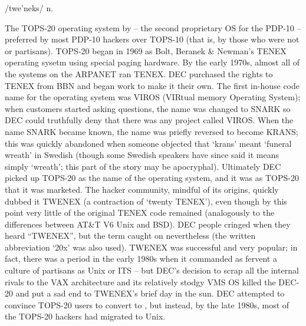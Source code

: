  /twe'neks/ n.

The TOPS-20 operating system by  -- the second proprietary OS for the PDP-10 -- preferred by most PDP-10 hackers over
TOPS-10 (that is, by those who were not  or  partisans). TOPS-20 began in 1969 as Bolt, Beranek \&
Newman's TENEX operating sysetm using special paging hardware. By the early 1970s, almost all of the systems on the ARPANET ran TENEX. DEC
purchased the rights to TENEX from BBN and began work to make it their own. The first in-house code name for the operating system was VIROS
(VIRtual memory Operating System); when customers started asking questions, the name was changed to SNARK so DEC could truthfully deny that
there was any project called VIROS. When the name SNARK became known, the name was priefly reversed to become KRANS; this was quickly
abandoned when someone objected that `krans' meant `funeral wreath' in Swedish (though some Swedish speakers have since said it means
simply `wreath'; this part of the story may be apocryphal). Ultimately DEC picked up TOPS-20 as the name of the operating system, and it
was as TOPS-20 that it was marketed. The hacker community, mindful of its origins, quickly dubbed it TWENEX (a contraction of `twenty
TENEX'), even though by this point very little of the original TENEX code remained (analogously to the differences between AT\&T V6 Unix
and BSD). DEC people cringed when they heard ``TWENEX'', but the term caught on nevertheless (the written abbreviation `20x' was also
used). TWENEX was successful and very popular; in fact, there was a period in the early 1980s when it commanded as fervent a culture of
partisans as Unix or ITS -- but DEC's decision to scrap all the internal rivals to the VAX architecture and its relatively stodgy VMS OS
killed the DEC-20 and put a sad end to TWENEX's brief day in the sun. DEC attempted to convince TOPS-20 users to convert to
, but instead, by the late 1980s, most of the TOPS-20 hackers had migrated to Unix.

